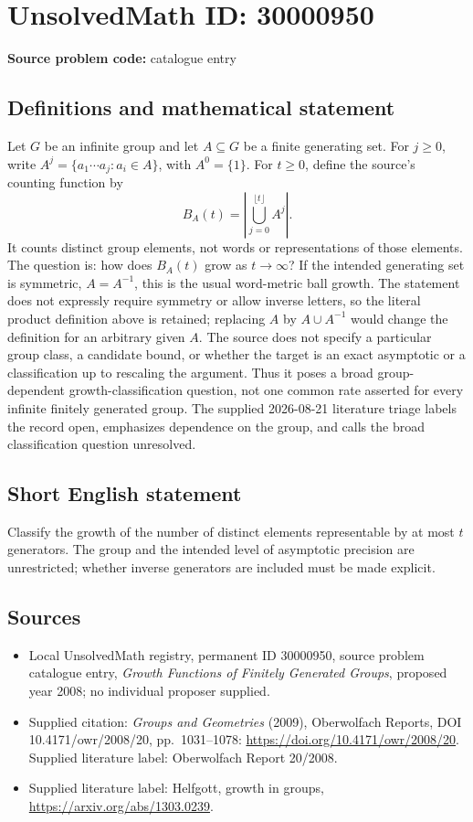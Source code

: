 \documentclass[11pt]{article}
\begin{document}
\section*{UnsolvedMath ID: 30000950}
\textbf{Source problem code:} catalogue entry
\subsection{Definitions and mathematical statement}
Let $G$ be an infinite group and let $A\subseteq G$ be a finite generating set. For $j\geq0$, write $A^j=\{a_1\cdots a_j:a_i\in A\}$, with $A^0=\{1\}$. For $t\geq0$, define the source's counting function by \[B_A(t)=\left|\bigcup_{j=0}^{\lfloor t\rfloor}A^j\right|.\] It counts distinct group elements, not words or representations of those elements. The question is: how does $B_A(t)$ grow as $t\to\infty$? If the intended generating set is symmetric, $A=A^{-1}$, this is the usual word-metric ball growth. The statement does not expressly require symmetry or allow inverse letters, so the literal product definition above is retained; replacing $A$ by $A\cup A^{-1}$ would change the definition for an arbitrary given $A$. The source does not specify a particular group class, a candidate bound, or whether the target is an exact asymptotic or a classification up to rescaling the argument. Thus it poses a broad group-dependent growth-classification question, not one common rate asserted for every infinite finitely generated group. The supplied 2026-08-21 literature triage labels the record open, emphasizes dependence on the group, and calls the broad classification question unresolved.
\subsection{Short English statement}
Classify the growth of the number of distinct elements representable by at most $t$ generators. The group and the intended level of asymptotic precision are unrestricted; whether inverse generators are included must be made explicit.
\subsection{Sources}
\begin{itemize}\item Local UnsolvedMath registry, permanent ID 30000950, source problem catalogue entry, \emph{Growth Functions of Finitely Generated Groups}, proposed year 2008; no individual proposer supplied.\item Supplied citation: \emph{Groups and Geometries} (2009), Oberwolfach Reports, DOI 10.4171/owr/2008/20, pp.\ 1031--1078: \url{https://doi.org/10.4171/owr/2008/20}. Supplied literature label: Oberwolfach Report 20/2008.\item Supplied literature label: Helfgott, growth in groups, \url{https://arxiv.org/abs/1303.0239}.\end{itemize}
\end{document}
